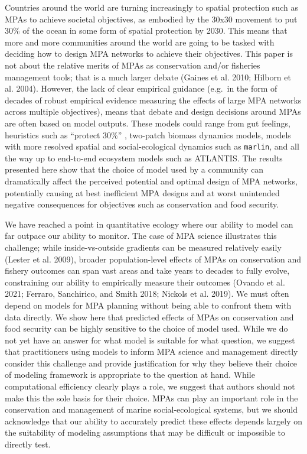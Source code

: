 \documentclass[
  default,
  lineno,
  referee]{sn-jnl}
\begin{document}
Countries around the world are turning increasingly to spatial
protection such as MPAs to achieve societal objectives, as embodied by
the 30x30 movement to put 30\% of the ocean in some form of spatial
protection by 2030. This means that more and more communities around the
world are going to be tasked with deciding how to design MPA networks to
achieve their objectives. This paper is not about the relative merits of
MPAs as conservation and/or fisheries management tools; that is a much
larger debate (Gaines et al. 2010; Hilborn et al. 2004). However, the
lack of clear empirical guidance (e.g.~in the form of decades of robust
empirical evidence measuring the effects of large MPA networks across
multiple objectives), means that debate and design decisions around MPAs
are often based on model outputs. These models could range from gut
feelings, heuristics such as ``protect 30\%'' , two-patch biomass
dynamics models, models with more resolved spatial and social-ecological
dynamics such as \texttt{marlin}, and all the way up to end-to-end
ecosystem models such as ATLANTIS. The results presented here show that
the choice of model used by a community can dramatically affect the
perceived potential and optimal design of MPA networks, potentially
causing at best inefficient MPA designs and at worst unintended negative
consequences for objectives such as conservation and food security.

We have reached a point in quantitative ecology where our ability to
model can far outpace our ability to monitor. The case of MPA science
illustrates this challenge; while inside-vs-outside gradients can be
measured relatively easily (Lester et al. 2009), broader
population-level effects of MPAs on conservation and fishery outcomes
can span vast areas and take years to decades to fully evolve,
constraining our ability to empirically measure their outcomes (Ovando
et al. 2021; Ferraro, Sanchirico, and Smith 2018; Nickols et al. 2019).
We must often depend on models for MPA planning without being able to
confront them with data directly. We show here that predicted effects of
MPAs on conservation and food security can be highly sensitive to the
choice of model used. While we do not yet have an answer for what model
is suitable for what question, we suggest that practitioners using
models to inform MPA science and management directly consider this
challenge and provide justification for why they believe their choice of
modeling framework is appropriate to the question at hand. While
computational efficiency clearly plays a role, we suggest that authors
should not make this the sole basis for their choice. MPAs can play an
important role in the conservation and management of marine
social-ecological systems, but we should acknowledge that our ability to
accurately predict these effects depends largely on the suitability of
modeling assumptions that may be difficult or impossible to directly
test.
\end{document}

